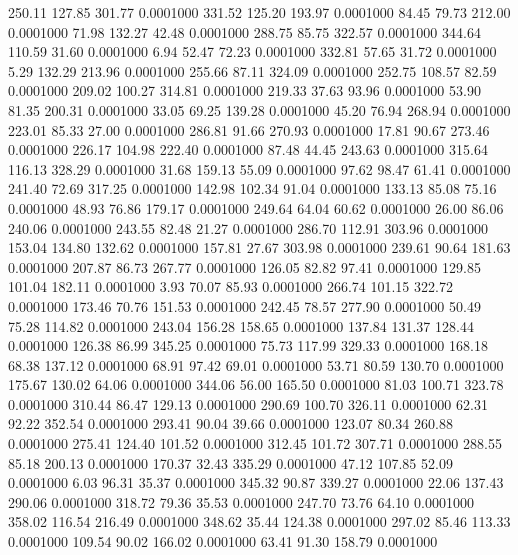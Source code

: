  250.11  127.85  301.77   0.0001000
 331.52  125.20  193.97   0.0001000
  84.45   79.73  212.00   0.0001000
  71.98  132.27   42.48   0.0001000
 288.75   85.75  322.57   0.0001000
 344.64  110.59   31.60   0.0001000
   6.94   52.47   72.23   0.0001000
 332.81   57.65   31.72   0.0001000
   5.29  132.29  213.96   0.0001000
 255.66   87.11  324.09   0.0001000
 252.75  108.57   82.59   0.0001000
 209.02  100.27  314.81   0.0001000
 219.33   37.63   93.96   0.0001000
  53.90   81.35  200.31   0.0001000
  33.05   69.25  139.28   0.0001000
  45.20   76.94  268.94   0.0001000
 223.01   85.33   27.00   0.0001000
 286.81   91.66  270.93   0.0001000
  17.81   90.67  273.46   0.0001000
 226.17  104.98  222.40   0.0001000
  87.48   44.45  243.63   0.0001000
 315.64  116.13  328.29   0.0001000
  31.68  159.13   55.09   0.0001000
  97.62   98.47   61.41   0.0001000
 241.40   72.69  317.25   0.0001000
 142.98  102.34   91.04   0.0001000
 133.13   85.08   75.16   0.0001000
  48.93   76.86  179.17   0.0001000
 249.64   64.04   60.62   0.0001000
  26.00   86.06  240.06   0.0001000
 243.55   82.48   21.27   0.0001000
 286.70  112.91  303.96   0.0001000
 153.04  134.80  132.62   0.0001000
 157.81   27.67  303.98   0.0001000
 239.61   90.64  181.63   0.0001000
 207.87   86.73  267.77   0.0001000
 126.05   82.82   97.41   0.0001000
 129.85  101.04  182.11   0.0001000
   3.93   70.07   85.93   0.0001000
 266.74  101.15  322.72   0.0001000
 173.46   70.76  151.53   0.0001000
 242.45   78.57  277.90   0.0001000
  50.49   75.28  114.82   0.0001000
 243.04  156.28  158.65   0.0001000
 137.84  131.37  128.44   0.0001000
 126.38   86.99  345.25   0.0001000
  75.73  117.99  329.33   0.0001000
 168.18   68.38  137.12   0.0001000
  68.91   97.42   69.01   0.0001000
  53.71   80.59  130.70   0.0001000
 175.67  130.02   64.06   0.0001000
 344.06   56.00  165.50   0.0001000
  81.03  100.71  323.78   0.0001000
 310.44   86.47  129.13   0.0001000
 290.69  100.70  326.11   0.0001000
  62.31   92.22  352.54   0.0001000
 293.41   90.04   39.66   0.0001000
 123.07   80.34  260.88   0.0001000
 275.41  124.40  101.52   0.0001000
 312.45  101.72  307.71   0.0001000
 288.55   85.18  200.13   0.0001000
 170.37   32.43  335.29   0.0001000
  47.12  107.85   52.09   0.0001000
   6.03   96.31   35.37   0.0001000
 345.32   90.87  339.27   0.0001000
  22.06  137.43  290.06   0.0001000
 318.72   79.36   35.53   0.0001000
 247.70   73.76   64.10   0.0001000
 358.02  116.54  216.49   0.0001000
 348.62   35.44  124.38   0.0001000
 297.02   85.46  113.33   0.0001000
 109.54   90.02  166.02   0.0001000
  63.41   91.30  158.79   0.0001000
